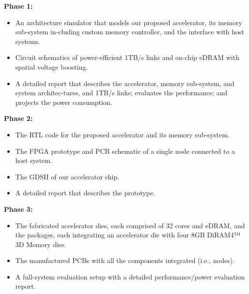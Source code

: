 \noindent
\textbf{Phase 1:}
\begin{itemize}
\item An architecture simulator that models our proposed accelerator, its memory sub-system in-cluding custom memory controller, and the interface with host systems.
\item Circuit schematics of power-efficient 1TB/s links and on-chip eDRAM with spatial voltage boosting.
\item A detailed report that describes the accelerator, memory sub-system, and system architec-tures, and 1TB/s links; evaluates the performance; and projects the power consumption.
\end{itemize}

\noindent
\textbf{Phase 2:}
\begin{itemize}
\item The RTL code for the proposed accelerator and its memory sub-system.
\item The FPGA prototype and PCB schematic of a single node connected to a host system.
\item The GDSII of our accelerator chip.
\item A detailed report that describes the prototype.
\end{itemize}

\noindent
\textbf{Phase 3:}
\begin{itemize}
\item The fabricated accelerator dies, each comprised of 32 cores and eDRAM, and the packages, each integrating an accelerator die with four 8GB DiRAM4™ 3D Memory dies.
\item The manufactured PCBs with all the components integrated (i.e., nodes).
\item A full-system evaluation setup with a detailed performance/power evaluation report.
\end{itemize}

